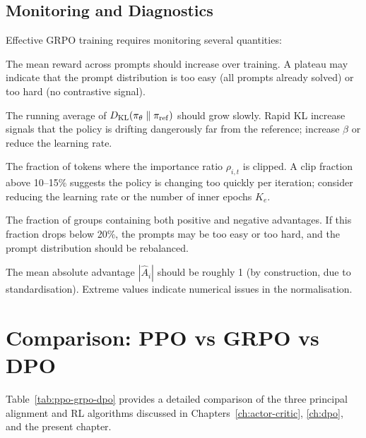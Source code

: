 \subsection{Monitoring and Diagnostics}

Effective GRPO training requires monitoring several quantities:
\begin{description}[leftmargin=!,labelwidth=3.5cm]
  \item[Reward curve] The mean reward across prompts should increase over training.  A plateau may indicate that the prompt distribution is too easy (all prompts already solved) or too hard (no contrastive signal).
  \item[KL divergence] The running average of $D_{\mathrm{KL}}\!\left(\pi_\theta\;\|\;\pi_\mathrm{ref}\right)$ should grow slowly.  Rapid KL increase signals that the policy is drifting dangerously far from the reference; increase $\beta$ or reduce the learning rate.
  \item[Clip fraction] The fraction of tokens where the importance ratio $\rho_{i,t}$ is clipped.  A clip fraction above 10--15\% suggests the policy is changing too quickly per iteration; consider reducing the learning rate or the number of inner epochs $K_e$.
  \item[Group diversity] The fraction of groups containing both positive and negative advantages.  If this fraction drops below 20\%, the prompts may be too easy or too hard, and the prompt distribution should be rebalanced.
  \item[Advantage magnitude] The mean absolute advantage $|\hat{A}_i|$ should be roughly 1 (by construction, due to standardisation).  Extreme values indicate numerical issues in the normalisation.
\end{description}

\section{Comparison: PPO vs GRPO vs DPO}
\label{sec:grpo-comparison}

Table~\ref{tab:ppo-grpo-dpo} provides a detailed comparison of the three principal alignment and RL algorithms discussed in Chapters~\ref{ch:actor-critic}, \ref{ch:dpo}, and the present chapter.

